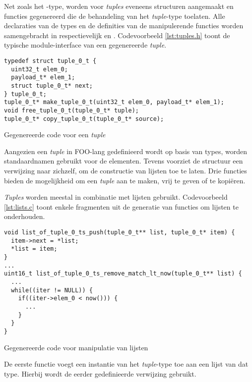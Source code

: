Net zoals het -type, worden voor \emph{tuples} eveneens structuren
aangemaakt en functies gegenereerd die de behandeling van het \emph{tuple}-type
toelaten. Alle declaraties van de types en de definities van de manipulerende
functies worden samengebracht in respectievelijk  en
. Codevoorbeeld \ref{lst:tuples.h} toont de typische
module-interface van een gegenereerde \emph{tuple}.

\begin{listing}[ht]
  \begin{verbatim}
typedef struct tuple_0_t {
  uint32_t elem_0;
  payload_t* elem_1;
  struct tuple_0_t* next;
} tuple_0_t;
tuple_0_t* make_tuple_0_t(uint32_t elem_0, payload_t* elem_1);
void free_tuple_0_t(tuple_0_t* tuple);
tuple_0_t* copy_tuple_0_t(tuple_0_t* source);
  \end{verbatim}
  \vspace{-5mm}
  \caption{Gegenereerde code voor een \emph{tuple}}
  \label{lst:tuples.h}
\end{listing}

Aangezien een \emph{tuple} in FOO-lang gedefinieerd wordt op basis van types,
worden standaardnamen gebruikt voor de elementen. Tevens voorziet de structuur
een verwijzing naar zichzelf, om de constructie van lijsten toe te laten. Drie
functies bieden de mogelijkheid om een \emph{tuple} aan te maken, vrij te geven
of te kopi\"eren.

\emph{Tuples} worden meestal in combinatie met lijsten gebruikt. Codevoorbeeld
\ref{lst:lists.c} toont enkele fragmenten uit de generatie van functies om lijsten
te onderhouden.

\begin{listing}[ht]
  \begin{verbatim}
void list_of_tuple_0_ts_push(tuple_0_t** list, tuple_0_t* item) {
  item->next = *list;
  *list = item;
}
...
uint16_t list_of_tuple_0_ts_remove_match_lt_now(tuple_0_t** list) {
  ...
  while((iter != NULL)) {
    if((iter->elem_0 < now())) {
      ...
    }
  }
}
  \end{verbatim}
  \vspace{-5mm}
  \caption{Gegenereerde code voor manipulatie van lijsten}
  \label{lst:lists.c}
\end{listing}

De eerste functie voegt een instantie van het \emph{tuple}-type toe aan een
lijst van dat type. Hierbij wordt de eerder gedefinieerde verwijzing gebruikt.

